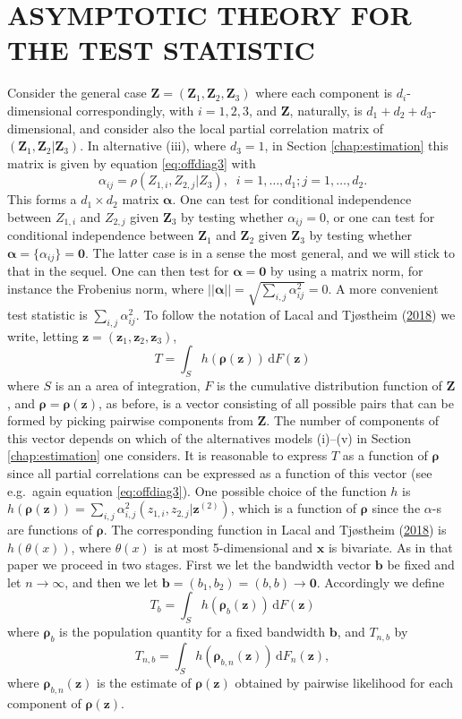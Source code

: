\documentclass[
  12pt,
  letterpaper]{article}
\numberwithin{equation}{section}
\newcommand{\x}{\bm{x}}
\newcommand{\Z}{\bm{Z}}
\newcommand{\z}{\bm{z}}
\newcommand{\ztwo}{\bm{z}^{(2)}}
\newcommand{\frho}{\bm{\rho}}
\newcommand{\bb}{\bm{b}}
\newcommand{\falpha}{\bm{\alpha}}
\newcommand{\di}{\,\textrm{d}}
\begin{document}
\hypertarget{asymptotic-theory-for-the-test-statistic}{%
\section{ASYMPTOTIC THEORY FOR THE TEST STATISTIC}\label{asymptotic-theory-for-the-test-statistic}}

Consider the general case \(\Z = (\Z_1, \Z_2, \Z_3)\) where each component is \(d_i\)-dimensional correspondingly, with \(i = 1,2,3\), and \(\Z\), naturally, is \(d_1+d_2+d_3\)-dimensional, and consider also the local partial correlation matrix of \((\Z_1,\Z_2|\Z_3)\). In alternative (iii), where \(d_3 = 1\), in Section \ref{chap:estimation} this matrix is given by equation \eqref{eq:offdiag3} with
\[
\alpha_{ij} = \rho(Z_{1,i},Z_{2,j}|Z_3), \;\; i=1,\ldots,d_1; j = 1,\dots,d_2.
\]
This forms a \(d_1 \times d_2\) matrix \({\falpha}\). One can test for conditional independence between \(Z_{1,i}\) and \(Z_{2,j}\) given \(\Z_3\) by testing whether \(\alpha_{ij}=0\), or one can test for conditional independence between \(\Z_1\) and \(\Z_2\) given \(\Z_3\) by testing whether \({\falpha} = \{\alpha_{ij}\} = {\bm{0}}\). The latter case is in a sense the most general, and we will stick to that in the sequel. One can then test for \({\falpha} = {\bm{0}}\) by using a matrix norm, for instance the Frobenius norm, where \(||{\falpha}|| = \sqrt{\sum_{i,j} \alpha_{ij}^2} = 0\). A more convenient test statistic is \(\sum_{i,j} \alpha_{ij}^2\). To follow the notation of Lacal and Tjøstheim (\protect\hyperlink{ref-lacal2018estimating}{2018}) we write, letting \(\z=(\z_1,\z_2,\z_3)\),
\[
T = \int_S h(\frho(\z)) \di F(\z)
\]
where \(S\) is an a area of integration, \(F\) is the cumulative distribution function of \(\Z\), and \(\frho = \frho(\z)\), as before, is a vector consisting of all possible pairs that can be formed by picking pairwise components from \(\Z\). The number of components of this vector depends on which of the alternatives models (i)--(v) in Section \ref{chap:estimation} one considers. It is reasonable to express \(T\) as a function of \(\frho\) since all partial correlations can be expressed as a function of this vector (see e.g.~again equation \eqref{eq:offdiag3}). One possible choice of the function \(h\) is \(h(\frho(\z)) = \sum_{i,j} \alpha_{i,j}^2(z_{1,i},z_{2,j}|\ztwo)\), which is a function of \(\frho\) since the \(\alpha\)-s are functions of \(\frho\). The corresponding function in Lacal and Tjøstheim (\protect\hyperlink{ref-lacal2018estimating}{2018}) is \(h(\theta(x))\), where \(\theta(x)\) is at most 5-dimensional and \(\x\) is bivariate. As in that paper we proceed in two stages. First we let the bandwidth vector \(\bb\) be fixed and let \(n \to \infty\), and then we let \(\bb = (b_1,b_2) = (b,b) \to \bm{0}\).
Accordingly we define
\[
T_b = \int_S h(\frho_b(\z)) \di F(\z) 
\]
where \(\frho_b\) is the population quantity for a fixed bandwidth \(\bb\), and \(T_{n,b}\) by
\[
T_{n,b} = \int_S h(\frho_{b,n}(\z)) \di F_n(\z),
\]
where \(\frho_{b,n}(\z)\) is the estimate of \(\frho(\z)\) obtained by pairwise likelihood for each component of \(\frho(\z)\).
\end{document}

